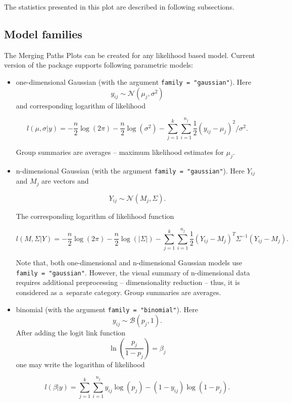\documentclass[12pt]{article}
\newcommand{\code}{\texttt}
\begin{document}
The statistics presented in this plot are described in following subsections.

\subsection{Model families}

The Merging Paths Plots can be created for any likelihood based model.  Current version of the package supports following parametric models: 

\begin{itemize}
\item one-dimensional Gaussian (with the argument \code{family = "gaussian"}).  Here 
$$
y_{ij} \sim \mathcal{N}\left(\mu_{j}, \sigma^2\right)
$$
and corresponding logarithm of likelihood

$$
l\left(\mu, \sigma | y\right) = 
-\frac{n}{2} \log{\left(2\pi\right)} -\frac{n}{2} \log{\left(\sigma^2\right)} -\sum_{j=1}^k\sum_{i=1}^{n_j}\frac{1}{2}\left(y_{ij} - \mu_j\right)^2/ \sigma^2.
$$

Group summaries are averages -- maximum likelihood estimates for $\mu_j$.

\item n-dimensional Gaussian (with the argument \code{family = "gaussian"}). Here $Y_{ij}$ and $M_j$ are vectors and

$$Y_{ij} \sim \mathcal N \left(M_j, \Sigma\right).$$

The corresponding logarithm of likelihood function

$$
l\left(M, \Sigma | Y\right) = 
-\frac{n}{2} \log{\left(2\pi\right)} -\frac{n}{2} \log{\left(|\Sigma|\right)} -
\sum_{j=1}^k\sum_{i=1}^{n_j}\frac{1}{2}\left(Y_{ij} - M_j\right)^T\Sigma^{-1}\left(Y_{ij} - M_j\right).
$$

Note that, both one-dimensional and n-dimensional Gaussian models use \code{family = "gaussian"}. However, the visual summary of n-dimensional data requires additional preprocessing -- dimensionality reduction -- thus, it is considered as a~separate category.
Group summaries are averages.

\item binomial (with the argument \code{family = "binomial"}). Here
$$y_{ij} \sim \mathcal{B}\left(p_{j}, 1\right).$$
After adding the logit link function 
$$\ln\left(\frac{p_j}{1 - p_j}\right) = \beta_j$$
one may write the logarithm of likelihood

$$l\left(\beta|y\right) = \sum_{j=1}^k\sum_{i=1}^{n_j} y_{ij}\log\left(p_j\right) - (1 - y_{ij}) \log{\left(1 - p_j\right)}.$$


\end{itemize}
\end{document}

